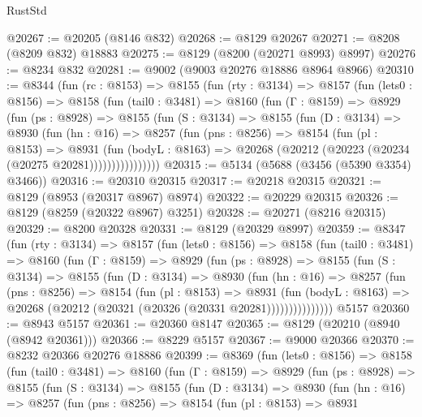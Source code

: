 \begin{lexlean}{RustStd}
\begin{coremodule}
@20267 := @20205 (@8146 @832)
@20268 := @8129 @20267
@20271 := @8208 (@8209 @832) @18883
@20275 := @8129 (@8200 (@20271 @8993) @8997)
@20276 := @8234 @832
@20281 := @9002 (@9003 @20276 @18886 @8964 @8966)
@20310 := @8344
    (fun (rc : @8153) =>
    @8155
      (fun (rty : @3134) =>
      @8157
        (fun (lets0 : @8156) =>
        @8158
          (fun (tail0 : @3481) =>
          @8160
            (fun (Γ : @8159) =>
            @8929
              (fun (ps : @8928) =>
              @8155
                (fun (S : @3134) =>
                @8155
                  (fun (D : @3134) =>
                  @8930
                    (fun (hn : @16) =>
                    @8257
                      (fun (pns : @8256) =>
                      @8154
                        (fun (pl : @8153) =>
                        @8931
                          (fun (bodyL : @8163) =>
                          @20268 (@20212 (@20223 (@20234 (@20275 @20281))))))))))))))))
@20315 := @5134 (@5688 (@3456 (@5390 @3354) @3466))
@20316 := @20310 @20315
@20317 := @20218 @20315
@20321 := @8129 (@8953 (@20317 @8967) @8974)
@20322 := @20229 @20315
@20326 := @8129 (@8259 (@20322 @8967) @3251)
@20328 := @20271 (@8216 @20315)
@20329 := @8200 @20328
@20331 := @8129 (@20329 @8997)
@20359 := @8347
    (fun (rty : @3134) =>
    @8157
      (fun (lets0 : @8156) =>
      @8158
        (fun (tail0 : @3481) =>
        @8160
          (fun (Γ : @8159) =>
          @8929
            (fun (ps : @8928) =>
            @8155
              (fun (S : @3134) =>
              @8155
                (fun (D : @3134) =>
                @8930
                  (fun (hn : @16) =>
                  @8257
                    (fun (pns : @8256) =>
                    @8154
                      (fun (pl : @8153) =>
                      @8931
                        (fun (bodyL : @8163) =>
                        @20268 (@20212 (@20321 (@20326 (@20331 @20281)))))))))))))))
    @5157
@20360 := @8943 @5157
@20361 := @20360 @8147
@20365 := @8129 (@20210 (@8940 (@8942 @20361)))
@20366 := @8229 @5157
@20367 := @9000 @20366
@20370 := @8232 @20366 @20276 @18886
@20399 := @8369
    (fun (lets0 : @8156) =>
    @8158
      (fun (tail0 : @3481) =>
      @8160
        (fun (Γ : @8159) =>
        @8929
          (fun (ps : @8928) =>
          @8155
            (fun (S : @3134) =>
            @8155
              (fun (D : @3134) =>
              @8930
                (fun (hn : @16) =>
                @8257
                  (fun (pns : @8256) =>
                  @8154
                    (fun (pl : @8153) =>
                    @8931

\end{coremodule}
\end{lexlean}
